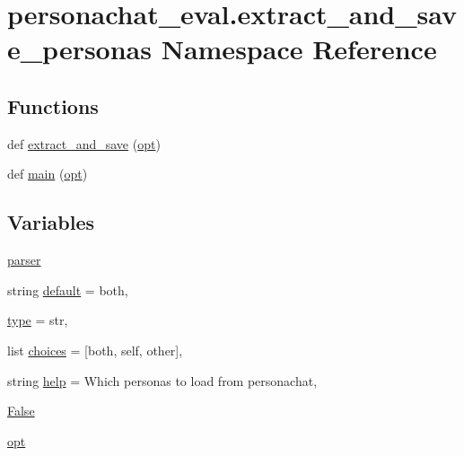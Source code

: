 \hypertarget{namespacepersonachat__eval_1_1extract__and__save__personas}{}\section{personachat\+\_\+eval.\+extract\+\_\+and\+\_\+save\+\_\+personas Namespace Reference}
\label{namespacepersonachat__eval_1_1extract__and__save__personas}
\subsection*{Functions}
\begin{DoxyCompactItemize}
\item 
def \hyperlink{namespacepersonachat__eval_1_1extract__and__save__personas_a7bae99c34a0b3f49cbce1328146926fd}{extract\+\_\+and\+\_\+save} (\hyperlink{namespacepersonachat__eval_1_1extract__and__save__personas_af8429edf17061783a8e88df2612ed634}{opt})
\item 
def \hyperlink{namespacepersonachat__eval_1_1extract__and__save__personas_aa39f496bc78dfa28c1fbc2c4129a915c}{main} (\hyperlink{namespacepersonachat__eval_1_1extract__and__save__personas_af8429edf17061783a8e88df2612ed634}{opt})
\end{DoxyCompactItemize}
\subsection*{Variables}
\begin{DoxyCompactItemize}
\item 
\hyperlink{namespacepersonachat__eval_1_1extract__and__save__personas_a0c7a023ff3a444b10a5a7241dcb2a654}{parser}
\item 
string \hyperlink{namespacepersonachat__eval_1_1extract__and__save__personas_ad30dd7296027c9500819dc1c99da8bb7}{default} = \textquotesingle{}both\textquotesingle{},
\item 
\hyperlink{namespacepersonachat__eval_1_1extract__and__save__personas_aaa2aa8bccd8967599740aecfd4d8cde9}{type} = str,
\item 
list \hyperlink{namespacepersonachat__eval_1_1extract__and__save__personas_aa78b9367f11da5f51dff879d09b130db}{choices} = \mbox{[}\textquotesingle{}both\textquotesingle{}, \textquotesingle{}self\textquotesingle{}, \textquotesingle{}other\textquotesingle{}\mbox{]},
\item 
string \hyperlink{namespacepersonachat__eval_1_1extract__and__save__personas_a691998cfb8d73e52c4ca6e116c026e31}{help} = \textquotesingle{}Which personas to load from personachat\textquotesingle{},
\item 
\hyperlink{namespacepersonachat__eval_1_1extract__and__save__personas_a7badd33b93a306d071f1c5c813dcf242}{False}
\item 
\hyperlink{namespacepersonachat__eval_1_1extract__and__save__personas_af8429edf17061783a8e88df2612ed634}{opt}
\end{DoxyCompactItemize}


